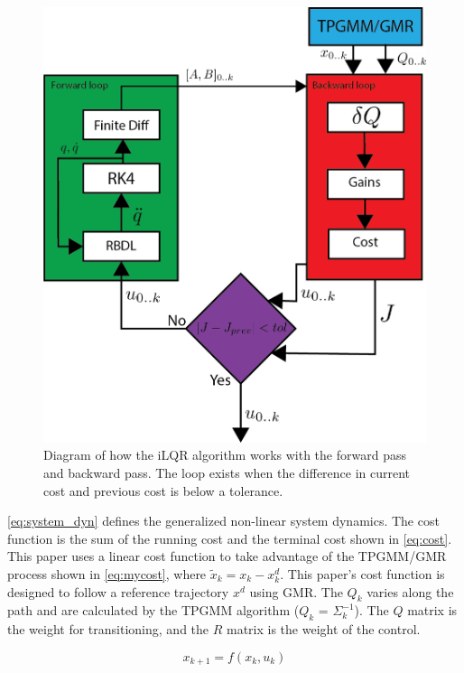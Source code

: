 \begin{figure}[h]
    \centering
    \includegraphics{images/controllers/ilqr2.png}
    \caption[iLQR Learning Loop Diagram]{Diagram of how the iLQR algorithm works with the forward pass and backward pass. The loop exists when the difference in current cost and previous cost is below a tolerance. }
    \label{fig:ilqrDiagram}
\end{figure}



\autoref{eq:system_dyn} defines the  generalized non-linear system dynamics. The cost function is the sum of the running cost and the terminal cost shown in \autoref{eq:cost}. This paper uses a linear cost function to take advantage of the TPGMM/GMR process shown in \autoref{eq:mycost}, where $\tilde{x}_k = x_k - x^{d}_k$. This paper's cost function is designed to follow a reference trajectory $x^{d}$ using GMR. The $Q_k$ varies along the path and  are calculated by the TPGMM algorithm ($Q_k$ =  $\Sigma_k^{-1}$). The  $Q$ matrix is the weight for transitioning, and the $R$ matrix is the weight of the control. 

\begin{equation}
     x_{k+1} = f(x_k,u_k) 
     \label{eq:system_dyn}
\end{equation}

